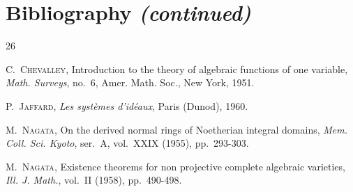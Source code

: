 \clearpage
{}
{}
\section*{Bibliography \textit{(continued)}}

\begin{thebibliography}{26}

C.~\textsc{Chevalley},
Introduction to the theory of algebraic functions of one variable,
\emph{Math. Surveys}, no.~6, Amer. Math. Soc., New York, 1951.

P.~\textsc{Jaffard},
\emph{Les systèmes d'idéaux}, Paris (Dunod), 1960.

M.~\textsc{Nagata},
On the derived normal rings of Noetherian integral domains,
\emph{Mem. Coll. Sci. Kyoto}, ser.~A, vol.~XXIX (1955), pp.~293-303.

M.~\textsc{Nagata},
Existence theorems for non projective complete algebraic varieties,
\emph{Ill. J. Math.}, vol.~II (1958), pp.~490-498.

\end{thebibliography}
